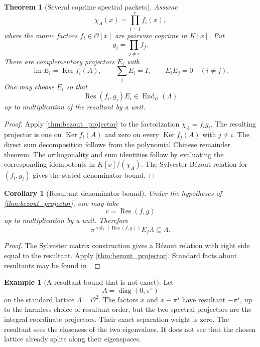\documentclass[11pt,a4paper]{article}
\newtheorem{theorem}{Theorem}[section]
\newtheorem{corollary}[corollary]{Corollary}
\theoremstyle{definition}
\newtheorem{example}[example]{Example}
\theoremstyle{remark}
\newcommand{\OO}{\mathcal O}
\newcommand{\End}{\operatorname{End}}
\newcommand{\im}{\operatorname{im}}
\newcommand{\Ker}{\operatorname{Ker}}
\newcommand{\val}{\operatorname{val}}
\newcommand{\diag}{\operatorname{diag}}
\newcommand{\Res}{\operatorname{Res}}
\providecommand{\End}{\operatorname{End}}
\providecommand{\im}{\operatorname{im}}
\providecommand{\Ker}{\operatorname{Ker}}
\providecommand{\Res}{\operatorname{Res}}
\providecommand{\diag}{\operatorname{diag}}
\providecommand{\OO}{\mathcal O}
\providecommand{\val}{\operatorname{val}}
\theoremstyle{definition}\newtheorem{construction}[theorem]{Construction}\newtheorem{certificate}[theorem]{Numerical Certificate}
\theoremstyle{remark}\newtheorem{boundary}[theorem]{Boundary}
\begin{document}
\begin{theorem}[Several coprime spectral packets]\label{thm:several_projectors}
Assume
\[
\chi_A(x)=\prod_{i=1}^rf_i(x),
\]
where the monic factors $f_i\in\OO[x]$ are pairwise coprime in $K[x]$.  Put
\[
g_i=\prod_{j\ne i}f_j.
\]
There are complementary projectors $E_i$ with
\[
\im E_i=\Ker f_i(A),
\qquad
\sum_iE_i=I,
\qquad
E_iE_j=0
\quad(i\ne j).
\]
One may choose $E_i$ so that
\[
\Res(f_i,g_i)E_i\in\End_{\OO}(\Lambda)
\]
up to multiplication of the resultant by a unit.
\end{theorem}

\begin{proof}
Apply \cref{thm:bezout_projector} to the factorization $\chi_A=f_ig_i$.  The resulting projector is one on $\Ker f_i(A)$ and zero on every $\Ker f_j(A)$ with $j\ne i$.  The direct sum decomposition follows from the polynomial Chinese remainder theorem.  The orthogonality and sum identities follow by evaluating the corresponding idempotents in $K[x]/(\chi_A)$.  The Sylvester Bézout relation for $(f_i,g_i)$ gives the stated denominator bound.
\end{proof}

\begin{corollary}[Resultant denominator bound]\label{cor:resultant_bound}
Under the hypotheses of \cref{thm:bezout_projector}, one may take
\[
r=\Res(f,g)
\]
up to multiplication by a unit.  Therefore
\[
\pi^{\val_\pi(\Res(f,g))}E_f\Lambda\subseteq\Lambda.
\]
\end{corollary}

\begin{proof}
The Sylvester matrix construction gives a Bézout relation with right side equal to the resultant.  Apply \cref{thm:bezout_projector}.  Standard facts about resultants may be found in \cite{Lang2002,GohbergLancasterRodman2009}.
\end{proof}

\begin{example}[A resultant bound that is not exact]\label{ex:loose_resultant}
Let
\[
A=\diag(0,\pi^s)
\]
on the standard lattice $\Lambda=\OO^2$.  The factors $x$ and $x-\pi^s$ have resultant $-\pi^s$, up to the harmless choice of resultant order, but the two spectral projectors are the integral coordinate projectors.  Their exact separation weight is zero.  The resultant sees the closeness of the two eigenvalues.  It does not see that the chosen lattice already splits along their eigenspaces.
\end{example}
\end{document}
